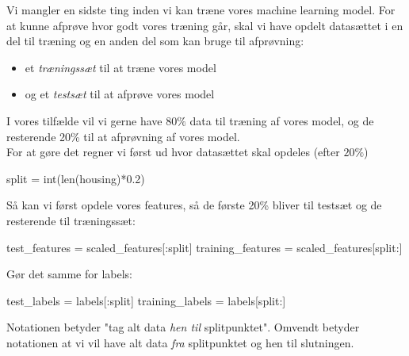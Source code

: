 \documentclass{ucph-handout}
\newcommand{\Ark}{} %
\renewcommand{\Title}{\Ark Machine Learning og huspriser - Udforsk datasættet}
\begin{document}

\begin{exercisebox}[adjusted title=Opdeling af datasættet]
Vi mangler en sidste ting inden vi kan træne vores machine learning model. For at kunne afprøve hvor godt vores træning går, skal vi have opdelt datasættet i en del til træning og en anden del som kan bruge til afprøvning:
\begin{itemize}
    \item et \textit{træningssæt} til at træne vores model
    \item og et \textit{testsæt} til at afprøve vores model
\end{itemize}
I vores tilfælde vil vi gerne have $80\%$ data til træning af vores model, og de resterende 20\% til at afprøvning af vores model. \\

For at gøre det regner vi først ud hvor datasættet skal opdeles (efter $20\%$)
\begin{python}
split = int(len(housing)*0.2)
\end{python}

Så kan vi først opdele vores features, så de første 20\% bliver til testsæt og de resterende til træningssæt:
\begin{python}
test_features = scaled_features[:split]
training_features = scaled_features[split:]
\end{python}

Gør det samme for labels:
\begin{python}
test_labels = labels[:split]
training_labels = labels[split:]
\end{python}

Notationen  betyder "tag alt data \textit{hen til} splitpunktet". Omvendt betyder notationen  at vi vil have alt data \textit{fra} splitpunktet og hen til slutningen.
\end{exercisebox}

\newpage
\renewcommand{\Title}{\Ark Machine Learning - træning og afprøvning af modeller}%
\end{document}
